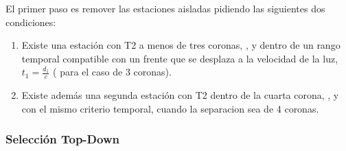 	El primer paso es remover las estaciones aisladas pidiendo las siguientes dos condiciones:
	 \begin{enumerate}
	  \item Existe una estación con T2 a menos de tres coronas, , y dentro de un rango temporal  compatible con un frente que se desplaza a la velocidad de la luz, $t_1=\frac{d_1}{c}$ ( para el caso de 3 coronas).
	  \item Existe adem\'as una segunda estación con T2 dentro de la cuarta corona, , y con el mismo criterio temporal,  cuando la separacion sea de 4 coronas.
	 \end{enumerate}
	
	\subsubsection{Selección Top-Down} 
	
